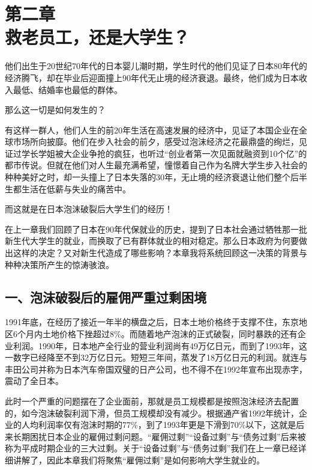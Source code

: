

\section[第二章\q 救老员工，还是大学生？]{第二章\\ 救老员工，还是大学生？}


{\fangsong 他们出生于20世纪70年代的日本婴儿潮时期，学生时代的他们见证了日本80年代的经济腾飞，却在毕业后迎面撞上90年代无止境的经济衰退。最终，他们成为日本收入最低、结婚率也最低的群体。\par}

{\fangsong 那么这一切是如何发生的？\par}

有这样一群人，他们人生的前20年生活在高速发展的经济中，见证了本国企业在全球市场所向披靡。他们在步入社会的前夕，感受过泡沫经济之花最鼎盛的绚烂，见证过学长学姐被大企业争抢的疯狂，也听过“创业者第一次见面就融资到10个亿”的都市传说。但就在他们对人生最充满希望，憧憬着自己作为名牌大学生步入社会的种种美好之时，却一头撞上了日本失落的30年，无止境的经济衰退让他们整个后半生都生活在低薪与失业的痛苦中。

而这就是在日本泡沫破裂后大学生们的经历！

在上一章我们回顾了日本在90年代保就业的历史，提到了日本社会通过牺牲那一批新生代大学生的就业，而换取了已有群体就业的相对稳定。那么日本政府为何要做出这样的决定？又对新生代造成了哪些影响？本章我将系统回顾这一决策的背景与种种决策所产生的惊涛骇浪。

\subsection{一、泡沫破裂后的雇佣严重过剩困境}

1991年底，在经历了接近一年半的横盘之后，日本土地价格终于支撑不住，东京地区6个月内土地价格下挫超过8\%。而随着地产泡沫的正式破裂，同时暴跌的还有企业利润。1990年，日本地产全行业的营业利润尚有49万亿日元，而到了1993年，这一数字已经降至不到32万亿日元。短短三年间，蒸发了18万亿日元的利润。就连与丰田公司并称为日本汽车帝国双璧的日产公司，也不得不在1992年宣布出现赤字，震动了全日本。

此时一个严重的问题摆在了企业面前，那就是员工规模都是按照泡沫经济去配置的，如今泡沫破裂利润下滑，但员工规模却没有减少。根据通产省1992年统计，企业的人均利润率仅有泡沫时期的77\%，到了1993年更是下滑到70\%以下，这就是后来长期困扰日本企业的雇佣过剩问题。“雇佣过剩”“设备过剩”与“债务过剩”后来被称为平成时期企业的三大过剩。关于“设备过剩”与“债务过剩”我们在上一章已经详细讲解了，因此本章我们将聚焦“雇佣过剩”是如何影响大学生就业的。

